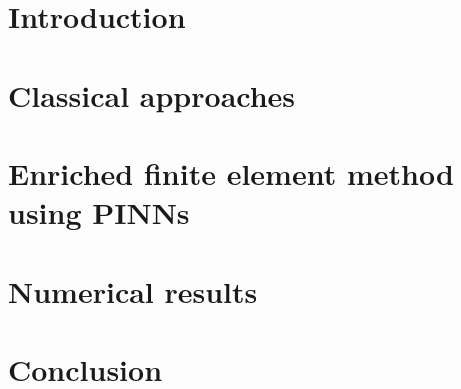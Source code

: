 \documentclass[compress,10pt,xcolor={table,dvipsnames},t]{beamer} %
\begin{document}
	\Background
	
	\section*{Introduction}
	

	\section{Classical approaches}
	

	\section[Enriched FEM using PINNs]{Enriched finite element method using PINNs}%
	

	\section{Numerical results}
	

	\section*{Conclusion}
\end{document}
